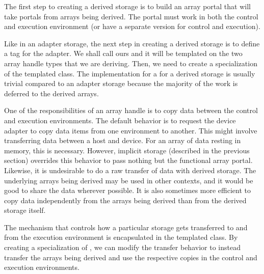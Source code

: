 The first step to creating a derived storage is to build an array portal
that will take portals from arrays being derived. The portal must work in
both the control and execution environment (or have a separate version for
control and execution).



Like in an adapter storage, the next step in creating a derived storage
is to define a tag for the adapter. We shall call ours
 and it will be templated on
the two array handle types that we are deriving. Then, we need to create a
specialization of the templated 
class. The implementation for a  for
a derived storage is usually trivial compared to an adapter storage
because the majority of the work is deferred to the derived arrays.


One of the responsibilities of an array handle is to copy data between the
control and execution environments. The default behavior is to request the
device adapter to copy data items from one environment to another. This
might involve transferring data between a host and device. For an array of
data resting in memory, this is necessary. However, implicit storage
(described in the previous section) overrides this behavior to pass nothing
but the functional array portal. Likewise, it is undesirable to do a raw
transfer of data with derived storage. The underlying arrays being
derived may be used in other contexts, and it would be good to share the
data wherever possible. It is also sometimes more efficient to copy data
independently from the arrays being derived than from the derived storage
itself.


The mechanism that controls how a particular storage gets
transferred to and from the execution environment is encapsulated in the
templated  class. By creating a
specialization of , we can modify the
transfer behavior to instead transfer the arrays being derived and use the
respective copies in the control and execution environments.


